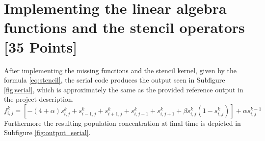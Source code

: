 \section{Implementing the linear algebra functions and the stencil operators [35 Points]}
After implementing the missing functions and the stencil kernel, given by the formula \ref{eq:stencil}, the serial code produces the output seen in Subfigure \ref{fig:serial}, which is approximately the same as the provided reference output in the project description.
\begin{equation} \label{eq:stencil}
f_{i, j}^k=\left[-(4+\alpha) s_{i, j}^k+s_{i-1, j}^k+s_{i+1, j}^k+s_{i, j-1}^k+s_{i, j+1}^k+\beta s_{i, j}^k\left(1-s_{i, j}^k\right)\right]+\alpha s_{i, j}^{k-1}
\end{equation}
Furthermore the resulting population concentration at final time is depicted in Subfigure \ref{fig:output_serial}.
